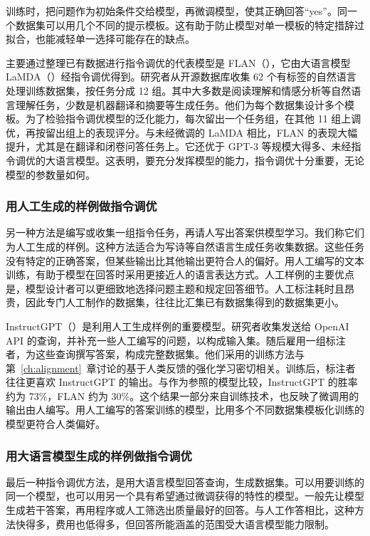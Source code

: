 训练时，把问题作为初始条件交给模型，再微调模型，使其正确回答“yes”。同一个数据集可以用几个不同的提示模板。这有助于防止模型对单一模板的特定措辞过拟合，也能减轻单一选择可能存在的缺点。

主要通过整理已有数据进行指令调优的代表模型是 FLAN（），它由大语言模型 LaMDA（）经指令调优得到。研究者从开源数据库收集 62 个有标签的自然语言处理训练数据集，按任务分成 12 组。其中大多数是阅读理解和情感分析等自然语言理解任务，少数是机器翻译和摘要等生成任务。他们为每个数据集设计多个模板。为了检验指令调优模型的泛化能力，每次留出一个任务组，在其他 11 组上调优，再按留出组上的表现评分。与未经微调的 LaMDA 相比，FLAN 的表现大幅提升，尤其是在翻译和闭卷问答任务上。它还优于 GPT-3 等规模大得多、未经指令调优的大语言模型。这表明，要充分发挥模型的能力，指令调优十分重要，无论模型的参数量如何。

\subsubsection{用人工生成的样例做指令调优}
另一种方法是编写或收集一组指令任务，再请人写出答案供模型学习。我们称它们为人工生成的样例。这种方法适合为写诗等自然语言生成任务收集数据。这些任务没有特定的正确答案，但某些输出比其他输出更符合人的偏好。用人工编写的文本训练，有助于模型在回答时采用更接近人的语言表达方式。人工样例的主要优点是，模型设计者可以更细致地选择问题主题和规定回答细节。人工标注耗时且昂贵，因此专门人工制作的数据集，往往比汇集已有数据集得到的数据集更小。

InstructGPT（）是利用人工生成样例的重要模型。研究者收集发送给 OpenAI API 的查询，并补充一些人工编写的问题，以构成输入集。随后雇用一组标注者，为这些查询撰写答案，构成完整数据集。他们采用的训练方法与第~\ref{ch:alignment}~章讨论的基于人类反馈的强化学习密切相关。训练后，标注者往往更喜欢 InstructGPT 的输出。与作为参照的模型比较，InstructGPT 的胜率约为 73\%，FLAN 约为 30\%。这个结果一部分来自训练技术，也反映了微调用的输出由人编写。用人工编写的答案训练的模型，比用多个不同数据集模板化训练的模型更符合人类偏好。

\subsubsection{用大语言模型生成的样例做指令调优}
最后一种指令调优方法，是用大语言模型回答查询，生成数据集。可以用要训练的同一个模型，也可以用另一个具有希望通过微调获得的特性的模型。一般先让模型生成若干答案，再用程序或人工筛选出质量最好的回答。与人工作答相比，这种方法快得多，费用也低得多，但回答所能涵盖的范围受大语言模型能力限制。

